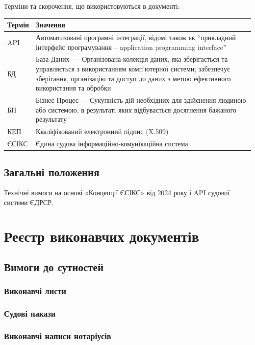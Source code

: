\documentclass{article}
\begin{document}
Терміни та скорочення, що використовуються в документі:

\begin{longtable}{p{4cm}p{10cm}}
\toprule
\textbf{Термін} & \textbf{Значення} \\
\midrule
API & Автоматизовані програмні інтеграції, відомі також як “прикладний інтерфейс програмування – application programming interface” \\
БД & База Даних — Організована колекція даних, яка зберігається та управляється з використанням комп'ютерної системи; забезпечує зберігання, організацію та доступ до даних з метою ефективного використання та обробки \\
БП & Бізнес Процес — Сукупність дій необхідних для здійснення людиною або системою, в результаті яких відбувається досягнення бажаного результату \\
КЕП & Кваліфікований електронний підпис (X.509) \\
ЄСІКС & Єдина судова інформаційно-комунікаційна система \\
\bottomrule
\end{longtable}

\subsection*{Загальні положення}

Технічні вимоги на основі «Концепції ЄСІКС» від 2024 року \cite{esiks} і API судової системи ЄДРСР\cite{eCourt}.

\newpage
\section{Реєстр виконавчих документів}

\subsection{Вимоги до сутностей}

\subsubsection{Виконавчі листи}
\subsubsection{Судові накази}
\subsubsection{Виконавчі написи нотаріусів}
\end{document}
